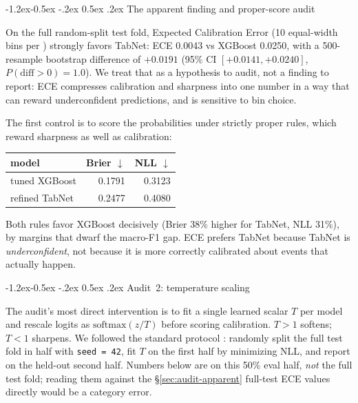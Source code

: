 \documentclass[11pt]{article}
\makeatletter
\renewcommand\subsection{\@startsection{subsection}{2}{\z@}%
  {-1.2ex\@plus -0.5ex \@minus -.2ex}%
  {0.5ex \@plus .2ex}%
  {\normalfont\normalsize\bfseries}}
\newcommand{\mF}{macro-F1}
\makeatother
\begin{document}
\subsection{The apparent finding and proper-score audit}\label{sec:audit-apparent}

On the full random-split test fold, Expected Calibration Error
(10 equal-width bins per \citealp{guo2017calibration}) strongly
favors TabNet: ECE 0.0043 vs XGBoost 0.0250, with a 500-resample
bootstrap difference of $+0.0191$ (95\% CI $[+0.0141, +0.0240]$,
$P(\mathrm{diff} > 0) = 1.0$). We treat that as a hypothesis to
audit, not a finding to report: ECE compresses calibration and
sharpness into one number in a way that can reward underconfident
predictions, and is sensitive to bin choice.\label{sec:audit-proper}

The first control is to score the probabilities under strictly
proper rules, which reward sharpness as well as calibration:

\begin{center}
\small
\begin{tabular}{lrr}
\toprule
model & Brier $\downarrow$ & NLL $\downarrow$ \\
\midrule
tuned XGBoost   & 0.1791 & 0.3123 \\
refined TabNet  & 0.2477 & 0.4080 \\
\bottomrule
\end{tabular}
\end{center}

Both rules favor XGBoost decisively (Brier 38\% higher for TabNet,
NLL 31\%), by margins that dwarf the \mF{} gap. ECE prefers TabNet
because TabNet is \emph{underconfident}, not because it is more
correctly calibrated about events that actually happen.

\subsection{Audit~2: temperature scaling}\label{sec:audit-temp}

The audit's most direct intervention is to fit a single learned
scalar $T$ per model and rescale logits as
$\mathrm{softmax}(z / T)$ before scoring calibration. $T > 1$
softens; $T < 1$ sharpens. We followed the standard protocol
\citep{guo2017calibration}: randomly split the full test fold in
half with \texttt{seed = 42}, fit $T$ on the first half by
minimizing NLL, and report on the held-out second half. Numbers
below are on this 50\% eval half, \emph{not} the full test fold;
reading them against the \S\ref{sec:audit-apparent} full-test ECE
values directly would be a category error.
\end{document}
